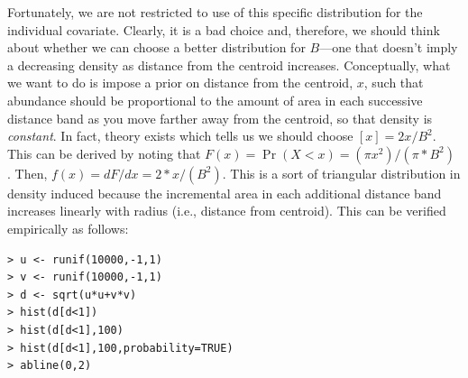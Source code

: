 Fortunately, we are not restricted to use of this specific
distribution for the individual covariate. Clearly, it is a bad choice
and, therefore, we should think about whether we can choose a better
distribution for $B$---one that doesn't imply a decreasing density as
distance from the centroid increases.  Conceptually, what we want to
do is impose a prior on distance from the centroid, $x$, such that
abundance should be proportional to the amount of area in each
successive distance band as you move farther away from the centroid,
so that density is {\it constant}.  In fact, theory exists which tells
us we should choose $[x] = 2x/B^2$. This can be derived by noting that
$F(x) = \Pr(X<x) = (\pi x^2)/(\pi*B^{2})$ . Then, $f(x) = dF/dx =
2*x/(B^{2})$. This is a sort of triangular distribution in density
induced because the incremental area in each additional distance band
increases linearly with radius (i.e., distance from centroid). This
can be verified empirically as follows: {\small
\begin{verbatim}
> u <- runif(10000,-1,1)
> v <- runif(10000,-1,1)
> d <- sqrt(u*u+v*v)
> hist(d[d<1])
> hist(d[d<1],100)
> hist(d[d<1],100,probability=TRUE)
> abline(0,2)
\end{verbatim}
}

